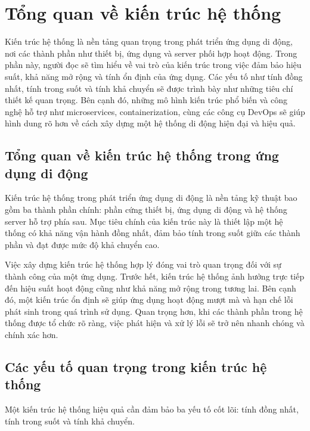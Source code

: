 
\section{Tổng quan về kiến trúc hệ thống}
\begin{flushleft}
    \hspace*{0.8cm}Kiến trúc hệ thống là nền tảng quan trọng trong phát triển ứng dụng di động, nơi các thành phần như thiết bị, ứng dụng và server phối hợp hoạt động. Trong phần này, người đọc sẽ tìm hiểu về vai trò của kiến trúc trong việc đảm bảo hiệu suất, khả năng mở rộng và tính ổn định của ứng dụng. Các yếu tố như tính đồng nhất, tính trong suốt và tính khả chuyển sẽ được trình bày như những tiêu chí thiết kế quan trọng. Bên cạnh đó, những mô hình kiến trúc phổ biến và công nghệ hỗ trợ như microservices, containerization, cùng các công cụ DevOps sẽ giúp hình dung rõ hơn về cách xây dựng một hệ thống di động hiện đại và hiệu quả.
\end{flushleft}
    \subsection{Tổng quan về kiến trúc hệ thống trong ứng dụng di động}
    \renewcommand{\labelitemi}{--}    
    \begin{flushleft}
            \hspace*{0.8cm}Kiến trúc hệ thống trong phát triển ứng dụng di động là nền tảng kỹ thuật bao gồm ba thành phần chính: phần cứng thiết bị, ứng dụng di động và hệ thống server hỗ trợ phía sau. Mục tiêu chính của kiến trúc này là thiết lập một hệ thống có khả năng vận hành đồng nhất, đảm bảo tính trong suốt giữa các thành phần và đạt được mức độ khả chuyển cao.
    \end{flushleft}

    \begin{flushleft}
        \hspace*{0.8cm}Việc xây dựng kiến trúc hệ thống hợp lý đóng vai trò quan trọng đối với sự thành công của một ứng dụng. Trước hết, kiến trúc hệ thống ảnh hưởng trực tiếp đến hiệu suất hoạt động cũng như khả năng mở rộng trong tương lai. Bên cạnh đó, một kiến trúc ổn định sẽ giúp ứng dụng hoạt động mượt mà và hạn chế lỗi phát sinh trong quá trình sử dụng. Quan trọng hơn, khi các thành phần trong hệ thống được tổ chức rõ ràng, việc phát hiện và xử lý lỗi sẽ trở nên nhanh chóng và chính xác hơn.
    \end{flushleft}

    \subsection{Các yếu tố quan trọng trong kiến trúc hệ thống}
    \renewcommand{\labelitemi}{--}
    \begin{flushleft}
        \hspace*{0.8cm}Một kiến trúc hệ thống hiệu quả cần đảm bảo ba yếu tố cốt lõi: tính đồng nhất, tính trong suốt và tính khả chuyển.
    \end{flushleft}

